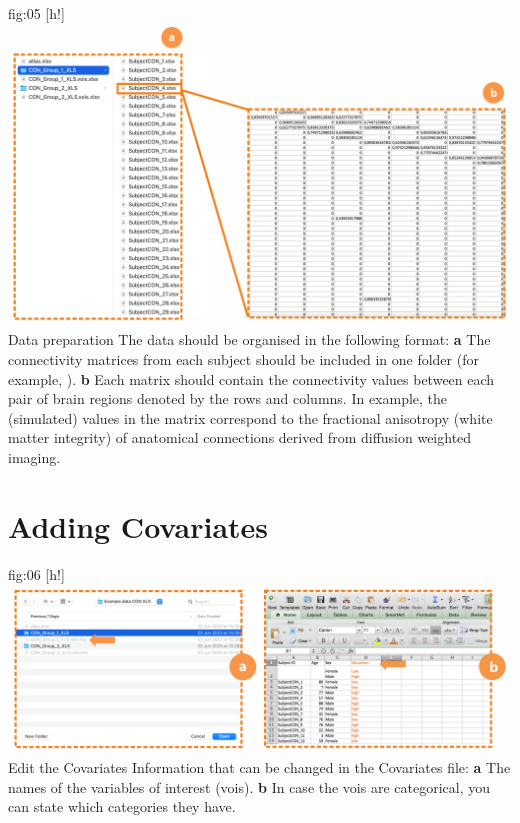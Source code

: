 \documentclass[justified]{tufte-handout}
\begin{document}
	{fig:05}
	{
	[h!]
	\includegraphics{fig05}
	}
	{Data preparation}
	{
	The data should be organised in the following format:
	{\bf a} The connectivity matrices from each subject should be included in one folder (for example, ). 
	{\bf b} Each matrix should contain the connectivity values between each pair of brain regions denoted by the rows and columns. In example, the (simulated) values in the matrix correspond to the fractional anisotropy (white matter integrity) of anatomical connections derived from diffusion weighted imaging.
	} 

\section{Adding Covariates}

	{fig:06}
	{
	[h!]
	\includegraphics{fig06}
	}
	{Edit the Covariates}
	{
	Information that can be changed in the Covariates file: 
	{\bf a} The names of the variables of interest (vois).
	{\bf b} In case the vois are categorical, you can state which categories they have.
	}
	
\end{document}
